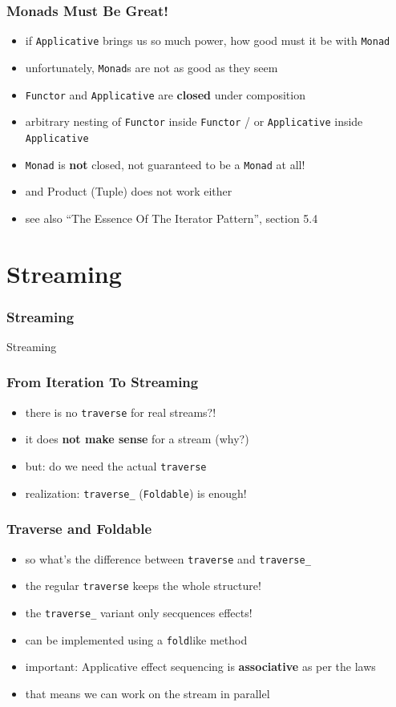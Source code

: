\documentclass[aspectratio=169]{beamer}
\begin{document}
\begin{frame}
  \frametitle{Monads Must Be Great!}
  \begin{itemize}
  \item if \texttt{Applicative} brings us so much power, how good must it be with \texttt{Monad}
  \item unfortunately, \texttt{Monad}s are not as good as they seem
  \item \texttt{Functor} and \texttt{Applicative} are \textbf{closed} under composition
  \item arbitrary nesting of \texttt{Functor} inside \texttt{Functor}
    / or \texttt{Applicative} inside \texttt{Applicative}
  \item \texttt{Monad} is \textbf{not} closed, not guaranteed to be a \texttt{Monad} at all!
  \item and Product (Tuple) does not work either
  \item see also ``The Essence Of The Iterator Pattern'', section 5.4
  \end{itemize}
\end{frame}

\section{Streaming}\label{sec:streaming}

\begin{frame}
  \frametitle{Streaming}
  \begin{center}
    \huge
    Streaming
  \end{center}
\end{frame}

\begin{frame}
  \frametitle{From Iteration To Streaming}
  \begin{itemize}
  \item there is no \texttt{traverse} for real streams?!
  \item it does \textbf{not make sense} for a stream (why?)
  \item but: do we need the actual \texttt{traverse}
  \item realization: \texttt{traverse\_} (\texttt{Foldable}) is enough!
  \end{itemize}
\end{frame}

\begin{frame}
  \frametitle{Traverse and Foldable}
  \begin{itemize}
  \item so what's the difference between \texttt{traverse} and \texttt{traverse\_}
  \item the regular \texttt{traverse} keeps the whole structure!
  \item the \texttt{traverse\_} variant only secquences effects!
  \item can be implemented using a \texttt{fold}like method
  \item important: Applicative effect sequencing is \textbf{associative} as per the laws
  \item that means we can work on the stream in parallel
  \end{itemize}
\end{frame}
\end{document}
